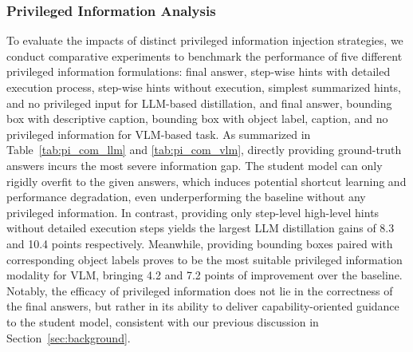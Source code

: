 \documentclass[]{jingdong}
\theoremstyle{plain}
\theoremstyle{definition}
\theoremstyle{remark}
\begin{document}
\subsubsection{Privileged Information Analysis}
\label{sec:pi_analysis}

To evaluate the impacts of distinct privileged information injection strategies, we conduct comparative experiments to benchmark the performance of five different privileged information formulations: final answer, step-wise hints with detailed execution process, step-wise hints without execution,  simplest summarized hints, and no privileged input for LLM-based distillation, and final answer, bounding box with descriptive caption, bounding box with object label, caption, and no privileged information for VLM-based task.
As summarized in Table~\ref{tab:pi_com_llm} and \ref{tab:pi_com_vlm}, directly providing ground-truth answers incurs the most severe information gap. The student model can only rigidly overfit to the given answers, which induces potential shortcut learning and performance degradation, even underperforming the baseline without any privileged information.
In contrast, providing only step-level high-level hints without detailed execution steps yields the largest LLM distillation gains of 8.3 and 10.4 points respectively. Meanwhile, providing bounding boxes paired with corresponding object labels proves to be the most suitable privileged information modality for VLM, bringing 4.2 and 7.2 points of improvement over the baseline.
Notably, the efficacy of privileged information does not lie in the correctness of the final answers, but rather in its ability to deliver capability-oriented guidance to the student model, consistent with our previous discussion in Section~\ref{sec:background}.
\end{document}
